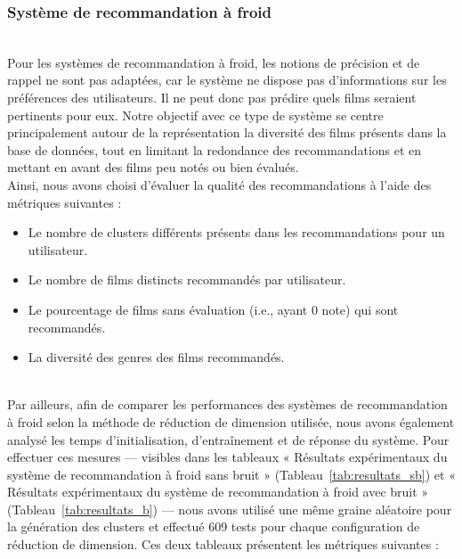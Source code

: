 \documentclass{article}
\begin{document}
    \subsubsection{Système de recommandation à froid}
    $ $\\
    Pour les systèmes de recommandation à froid, les notions de précision et de rappel ne sont pas adaptées, 
    car le système ne dispose pas d'informations sur les préférences des utilisateurs. Il ne peut donc pas 
    prédire quels films seraient pertinents pour eux. Notre objectif avec ce type de système se centre principalement 
    autour de la représentation la diversité des films présents dans la base de données, tout en limitant la 
    redondance des recommandations et en mettant en avant des films peu notés ou bien évalués.\\
    Ainsi, nous avons choisi d'évaluer la qualité des recommandations à l'aide des métriques suivantes :\\
    \begin{itemize}
        \item Le nombre de clusters différents présents dans les recommandations pour un utilisateur.
        \item Le nombre de films distincts recommandés par utilisateur.
        \item Le pourcentage de films sans évaluation (i.e., ayant 0 note) qui sont recommandés.
        \item La diversité des genres des films recommandés.
    \end{itemize}
    $ $\\
    Par ailleurs, afin de comparer les performances des systèmes de recommandation à froid selon la méthode de
    réduction de dimension utilisée, nous avons également analysé les temps d’initialisation, d’entraînement
    et de réponse du système. Pour effectuer ces mesures — visibles dans les tableaux « Résultats expérimentaux 
    du système de recommandation à froid sans bruit » (Tableau~\ref{tab:resultats_sb}) et « Résultats expérimentaux 
    du système de recommandation à froid avec bruit » (Tableau~\ref{tab:resultats_b}) — nous avons utilisé une même 
    graine aléatoire pour la génération des clusters et effectué 609 tests pour chaque configuration de réduction de dimension.
    Ces deux tableaux présentent les métriques suivantes :\\
\end{document}
